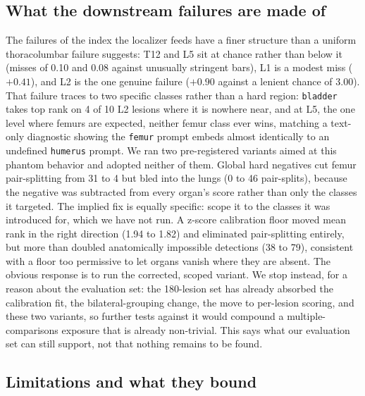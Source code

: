 \documentclass[10pt]{article}
\newcommand{\org}[1]{\texttt{#1}}
\begin{document}
\subsection{What the downstream failures are made of}

The failures of the index the localizer feeds have a
finer structure than a uniform thoracolumbar failure suggests: T12 and L5 sit
at chance rather than below it (misses of 0.10 and 0.08 against unusually
stringent bars), L1 is a modest miss ($+0.41$), and L2 is the one genuine
failure ($+0.90$ against a lenient chance of 3.00). That failure traces to
two specific classes rather than a hard region: \org{bladder} takes top rank
on 4 of 10 L2 lesions where it is nowhere near, and at L5, the one level
where femurs are expected, neither femur class ever wins, matching a
text-only diagnostic showing the \org{femur} prompt embeds almost identically
to an undefined \org{humerus} prompt. We ran two pre-registered variants
aimed at this phantom behavior and adopted neither of them. Global hard
negatives cut femur pair-splitting from 31 to 4 but bled into the lungs (0 to
46 pair-splits), because the negative was subtracted from every organ's score
rather than only the classes it targeted. The implied fix is equally
specific: scope it to the classes it was introduced for, which we have not
run. A z-score calibration floor moved mean rank in the right direction
(1.94 to 1.82) and eliminated pair-splitting entirely, but more than doubled
anatomically impossible detections (38 to 79), consistent with a floor too
permissive to let organs vanish where they are absent. The obvious response
is to run the corrected, scoped variant. We stop instead, for a reason about
the evaluation set: the 180-lesion set has already absorbed the calibration
fit, the bilateral-grouping change, the move to per-lesion scoring, and these
two variants, so further tests against it would compound a
multiple-comparisons exposure that is already non-trivial. This says what our
evaluation set can still support, not that nothing remains to be found.

\subsection{Limitations and what they bound}
\end{document}
